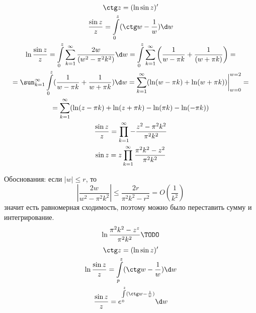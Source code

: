 \begin{exmp}
	\begin{gather*}
		\ctg z = (\ln \sin z)' \\
		\frac{\sin z}z = \int\limits_0^z (\ctg w - \frac1w) \d w \\
		\ln \frac{\sin z}z =
		\int\limits_0^z \sum_{k=1}^\infty \frac{2w}{(w^2  - \pi^2 k^2)} \d w =
		\int\limits_0^z \sum_{k=1}^\infty \left( \frac1{w - \pi k} + \frac1{(w + \pi k)} \right) = \\ =
		\sun_{k=1}^\infty \int\limits_0^z (\frac1{w - \pi k} + \frac1{w + \pi k }) \d w =
		\sum_{k=1}^\infty (\ln(w - \pi k) + \ln(w + \pi k)) \bigg|_{w = 0}^{w = 2} = \\ =
		\sum_{k=1}^{\infty} (\ln(z - \pi k) + \ln(z + \pi k) - \ln(\pi k) - \ln(-\pi k)) \\
		\frac{\sin z}z = \prod_{k=1}^\infty -\frac{z^2 - \pi^2 k^2}{\pi^2 k^2} \\
		\sin z = z\prod_{k=1}^\infty \frac{\pi^2k^2 - z^2}{\pi^2 k^2}
	\end{gather*}

	Обоснования:
	если $|w| \le r$, то
	\[ \left| \frac{2w}{w^2 - \pi^2 k^2} \right| \le \frac{2r}{\pi^2 k^2 - r^2} = O(\frac1{k^2}) \]
	значит есть равномерная сходимость, поэтому можно было переставить сумму и интегрирование.
	\[ \ln\frac{\pi^2 k^2 - z^z}{\pi^2 k^2} \TODO \]
	\begin{gather*}
		\ctg z = (\ln \sin z)' \\
		\ln \frac{\sin z}z = \int\limits_p^z (\ctg w - \frac1w) \d w\\
		\frac{\sin z}z = e^{\int\limits_0^z (\ctg w - \frac1w)} \d w
	\end{gather*}
\end{exmp}
